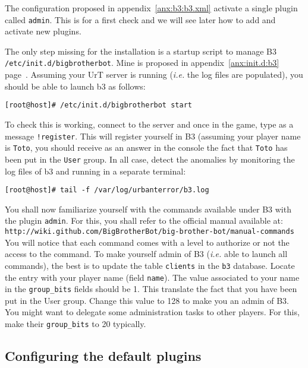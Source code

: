 The configuration proposed in appendix~\ref{anx:b3:b3.xml} activate a single
plugin called \texttt{admin}. 
This is for a first check and we will see later how to add and activate new
plugins. 

The only step missing for the installation is a startup script to manage B3 
\texttt{/etc/init.d/bigbrotherbot}.  
Mine is proposed in appendix~\ref{anx:init.d:b3} page~\pageref{anx:init.d:b3}.  
Assuming your UrT server is running (\emph{i.e.} the log files are populated),
you should be able to launch b3 as follows: 
\begin{lstlisting}[style=command]
[root@host]# /etc/init.d/bigbrotherbot start
\end{lstlisting}

To check this is working, connect to the server and once in the game, type as a
message \verb/!register/. This will register yourself in B3 (assuming your
player name is \texttt{Toto}, you should receive as an answer in the console the
fact that \texttt{Toto} has been put in the \texttt{User} group. 
In all case, detect the anomalies by monitoring the log files of b3 and running
in a separate terminal:
\begin{lstlisting}[style=command]
[root@host]# tail -f /var/log/urbanterror/b3.log
\end{lstlisting}

\noindent 
You shall now familiarize yourself with the commands available under B3 with the
plugin \texttt{admin}. 
For this, you shall refer to the official manual available at: 
\texttt{http://wiki.github.com/BigBrotherBot/big-brother-bot/manual-commands}\\

You will notice that each command comes with a level to authorize or not the
access to the command. 
To make yourself admin of B3 (\emph{i.e.} able to launch all commands), the best
is to update the table \texttt{clients} in the \texttt{b3} database. 
Locate the entry with your player name (field \texttt{name}). 
The value associated to your name in the \texttt{group\_bits} fields should be
1. This translate the fact that you have been put in the User group. 
Change this value to 128 to make you an admin of B3. 
%
You might want to delegate some administration tasks to other players. 
For this, make their \texttt{group\_bits} to 20 typically. 

\subsection{Configuring the default plugins}
\label{sec:b3:plugins}

